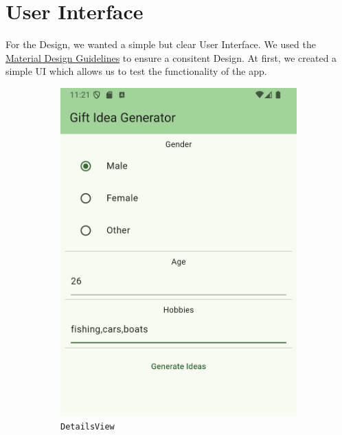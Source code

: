 \section*{User Interface}

For the Design, we wanted a simple but clear User Interface. We used the  \href{https://m3.material.io/}{Material Design Guidelines} to ensure a consitent Design. At first, we created a simple UI which allows us to test the functionality of the app.

\begin{figure}

	\begin{subfigure}{0.5\textwidth}
		\includegraphics[width=0.9\linewidth]{figures/screenshots/old_details_view_cropped.png}
		\caption{\texttt{DetailsView}}
	\end{subfigure}
	\begin{subfigure}{0.5\textwidth}

\end{subfigure}
\end{figure}
